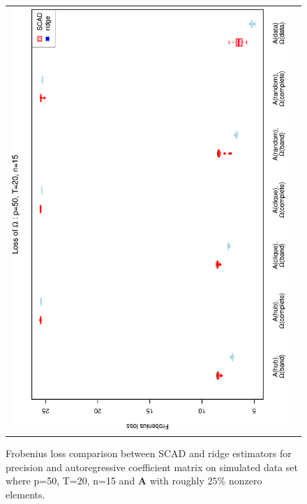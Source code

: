 \begin{figure}[h!]
\begin{tabular}{cc}
\includegraphics[scale=0.45,angle=270]{LossOmega50T20N15_25.eps}
\end{tabular}
\caption{Frobenius loss comparison between SCAD and ridge estimators for precision and autoregressive coefficient matrix on simulated data set where p=50, T=20, n=15  and $\mathbf{A}$ with roughly $25\%$ nonzero elements.}
\label{figSM:Loss50T20N15_25}
\end{figure}
\clearpage


